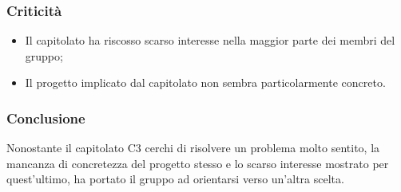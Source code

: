     \subsubsection{Criticità}
    \begin{itemize}
    		\item Il capitolato ha riscosso scarso interesse nella maggior parte dei membri del gruppo;
    		\item Il progetto implicato dal capitolato non sembra particolarmente concreto.
    \end{itemize}
    \subsubsection{Conclusione}
    Nonostante il capitolato C3 cerchi di risolvere un problema molto sentito, la mancanza di concretezza del progetto stesso e lo scarso interesse mostrato per quest'ultimo, ha portato il gruppo ad orientarsi verso un'altra scelta.